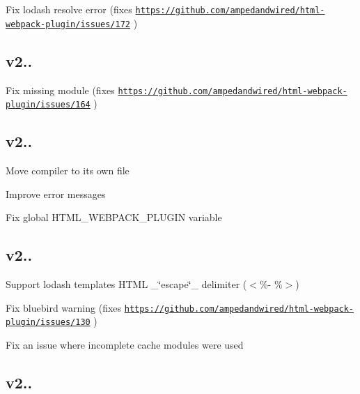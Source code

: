 \begin{DoxyItemize}
\item Fix {\ttfamily lodash} resolve error (fixes \href{https://github.com/ampedandwired/html-webpack-plugin/issues/172}{\tt https\+://github.\+com/ampedandwired/html-\/webpack-\/plugin/issues/172} )
\end{DoxyItemize}

\subsection*{v2.. }


\begin{DoxyItemize}
\item Fix missing module (fixes \href{https://github.com/ampedandwired/html-webpack-plugin/issues/164}{\tt https\+://github.\+com/ampedandwired/html-\/webpack-\/plugin/issues/164} )
\end{DoxyItemize}

\subsection*{v2.. }


\begin{DoxyItemize}
\item Move compiler to its own file
\item Improve error messages
\item Fix global H\+T\+M\+L\+\_\+\+W\+E\+B\+P\+A\+C\+K\+\_\+\+P\+L\+U\+G\+IN variable
\end{DoxyItemize}

\subsection*{v2.. }


\begin{DoxyItemize}
\item Support {\ttfamily lodash} template\textquotesingle{}s H\+T\+ML \+\_\+\char`\"{}escape\char`\"{}\+\_\+ delimiter ({\ttfamily $<$\%-\/ \%$>$})
\item Fix bluebird warning (fixes \href{https://github.com/ampedandwired/html-webpack-plugin/issues/130}{\tt https\+://github.\+com/ampedandwired/html-\/webpack-\/plugin/issues/130} )
\item Fix an issue where incomplete cache modules were used
\end{DoxyItemize}

\subsection*{v2.. }


